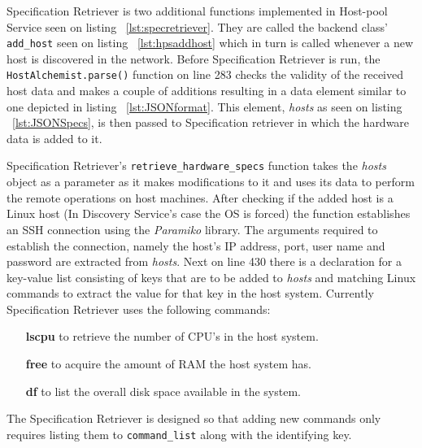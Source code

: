 Specification Retriever is two additional functions implemented in Host-pool Service seen on listing ~\ref{lst:specretriever}. They are called the backend class' \verb|add_host| seen on listing ~\ref{lst:hpsaddhost} which in turn is called whenever a new host is discovered in the network. Before Specification Retriever is run, the \verb|HostAlchemist.parse()| function on line 283 checks the validity of the received host data and makes a couple of additions resulting in a data element similar to one depicted in listing ~\ref{lst:JSONformat}. This element, \textit{hosts} as seen on listing ~\ref{lst:JSONSpecs}, is then passed to Specification retriever in which the hardware data is added to it.



Specification Retriever's \verb|retrieve_hardware_specs| function takes the \textit{hosts} object as a parameter as it makes modifications to it and uses its data to perform the remote operations on host machines. After checking if the added host is a Linux host (In Discovery Service's case the OS is forced) the function establishes an SSH connection using the \textit{Paramiko} library\cite{paramiko}. The arguments required to establish the connection, namely the host's IP address, port, user name and password are extracted from \textit{hosts}. Next on line 430 there is a declaration for a key-value list consisting of keys that are to be added to \textit{hosts} and matching Linux commands to extract the value for that key in the host system. Currently Specification Retriever uses the following commands:

\begin{itemize}
\item[\textbf{lscpu}] to retrieve the number of CPU's in the host system.
\item[\textbf{free}] to acquire the amount of RAM the host system has.
\item[\textbf{df}] to list the overall disk space available in the system.
\end{itemize}

The Specification Retriever is designed so that adding new commands only requires listing them to \verb|command_list| along with the identifying key. 

